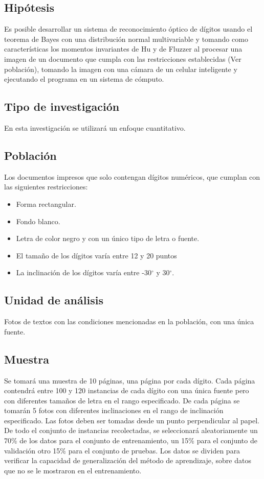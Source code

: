 \documentclass[a4paper, 11pt, oneside]{article}
\begin{document}
	\subsection{Hipótesis}
	Es posible desarrollar un sistema de reconocimiento óptico de dígitos usando el teorema
	de Bayes con una distribución normal multivariable y tomando como características los
	momentos invariantes de Hu y de Fluzzer al procesar una imagen de un documento que 
	cumpla con las restricciones establecidas (Ver población), tomando la imagen con
	una cámara de un celular inteligente y ejecutando el programa en un sistema de cómputo.
		
	\subsection{Tipo de investigación}
	En esta investigación se utilizará un enfoque cuantitativo.
	
	\subsection{Población}
	Los documentos impresos que solo contengan dígitos numéricos, que cumplan con las siguientes restricciones:
	\begin{itemize}
	\item Forma rectangular.
	\item Fondo blanco.
	\item Letra de color negro y con un único tipo de letra o fuente.
	\item El tamaño de los dígitos varía entre 12 y 20 puntos
	\item La inclinación de los dígitos varía entre -30$^{\circ}$ y 30$^{\circ}$.
	\end{itemize}
	
	\subsection{Unidad de análisis}
	Fotos de textos con las condiciones mencionadas en la población, con una única fuente.

	\subsection{Muestra}
	Se tomará una muestra de 10 páginas, una página por cada dígito. Cada página contendrá entre 100
	y 120 instancias de cada dígito con una única fuente pero con diferentes tamaños de letra en el
	rango especificado. De cada página se tomarán 5 fotos con diferentes inclinaciones en el rango
	de inclinación especificado. Las fotos deben ser tomadas desde un punto perpendicular al papel.
	De todo el conjunto de instancias recolectadas, se seleccionará aleatoriamente un 70\% de los
	datos para el conjunto de entrenamiento, un 15\% para el conjunto de validación otro 15\% para
	el conjunto de pruebas. Los datos se dividen para verificar la capacidad de generalización del
	método de aprendizaje, sobre datos que no se le mostraron en el entrenamiento.
	
\end{document}
